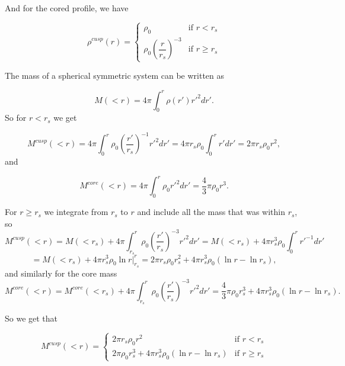 \documentclass[a4paper,norsk, 10pt]{article}
\begin{document}
And for the cored profile, we have

\begin{equation}
\rho^{cusp}(r) =
\left\{
	\begin{array}{ll}
		\rho_0  & \mbox{if } r < r_s \\
		\rho_0\left(\dfrac{r}{r_s}\right)^{-3} & \mbox{if } r \geq r_s
	\end{array}
\right.
\end{equation}

The mass of a spherical symmetric system can be written as 

\begin{equation}
M(<r) = 4\pi \int_0^r \rho(r') r'^2 dr'.
\end{equation}
So for $r<r_s$ we get

\begin{equation}
M^{cusp}(<r) = 4\pi \int_0^r \rho_0\left(\dfrac{r'}{r_s}\right)^{-1} r'^2 dr' = 4\pi r_s \rho_0 \int_0^r r' dr'  = 2\pi r_s \rho_0 r^2,
\end{equation}
and

\begin{equation}
M^{core}(<r) = 4\pi \int_0^r \rho_0 r'^2 dr' = \dfrac{4}{3}\pi \rho_0 r^3. 
\end{equation}

For $r\geq r_s$ we integrate from $r_s$ to $r$ and include all the mass that was within $r_s$, so
\begin{equation}
M^{cusp}(<r) = M(<r_s) + 4\pi \int_{r_s}^r \rho_0\left(\dfrac{r'}{r_s}\right)^{-3} r'^2 dr' = M(<r_s) +  4\pi r_s^3 \rho_0 \int_0^r r'^{-1} dr'  
\end{equation}
\begin{equation}
= M(<r_s) +  4\pi r_s^3 \rho_0 \ln r \big|_{r_s}^r = 2\pi r_s \rho_0 r_s^2 + 4\pi r_s^3 \rho_0 (\ln r - \ln r_s),
\end{equation}
and similarly for the core mass
\begin{equation}
M^{core}(<r) = M^{core}(<r_s) + 4\pi \int_{r_s}^r \rho_0\left(\dfrac{r'}{r_s}\right)^{-3} r'^2 dr' = \dfrac{4}{3}\pi \rho_0 r_s^3 + 4\pi r_s^3 \rho_0 (\ln r - \ln r_s).
\end{equation}

So we get that

\begin{equation}
M^{cusp}(<r) =
\left\{
	\begin{array}{ll}
		2\pi r_s \rho_0 r^2  & \mbox{if } r < r_s \\
		2\pi  \rho_0 r_s^3 + 4\pi r_s^3 \rho_0 (\ln r - \ln r_s) & \mbox{if } r \geq r_s
	\end{array}
\right.
\end{equation}
\end{document}
